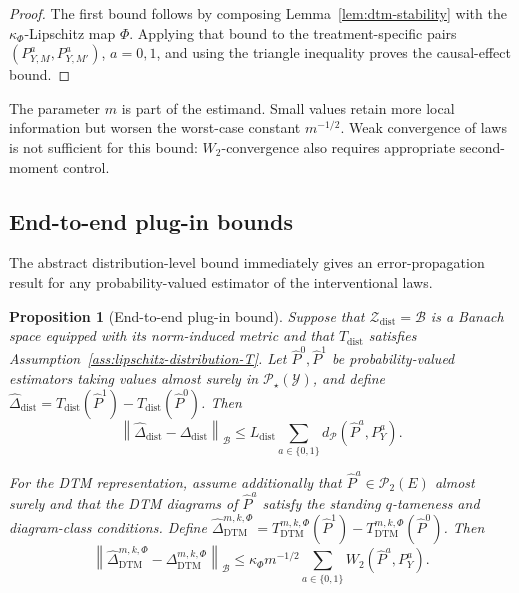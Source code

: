 \documentclass[11pt,a4paper]{article}
\theoremstyle{plain}
\newtheorem{proposition}[theorem]{Proposition}
\theoremstyle{definition}
\theoremstyle{remark}
\newcommand{\1}{\mathbbm{1}}
\begin{document}
\begin{proof}
The first bound follows by composing
Lemma~\ref{lem:dtm-stability} with the
\(\kappa_\Phi\)-Lipschitz map \(\Phi\). Applying that bound to
the treatment-specific pairs
\((P_{Y,M}^a,P_{Y,M'}^a)\), \(a=0,1\), and using the triangle
inequality proves the causal-effect bound.
\end{proof}

The parameter \(m\) is part of the estimand. Small values retain more local information but worsen the worst-case constant \(m^{-1/2}\). Weak convergence of laws is not sufficient for this bound: \(W_2\)-convergence also requires appropriate second-moment control.

\subsection{End-to-end plug-in bounds}
\label{subsec:end-to-end-distribution}

The abstract distribution-level bound immediately gives an
error-propagation result for any probability-valued estimator of the interventional laws.

\begin{proposition}[End-to-end plug-in bound]
\label{prop:end-to-end-distribution}
Suppose that
\(\mathcal Z_{\mathrm{dist}}=\mathcal B\) is a Banach space
equipped with its norm-induced metric and that
\(T_{\mathrm{dist}}\) satisfies
Assumption~\ref{ass:lipschitz-distribution-T}. Let
\(\widehat P^0,\widehat P^1\) be probability-valued estimators
taking values almost surely in
\(\mathcal P_\star(\mathcal Y)\), and define
\(\widehat\Delta_{\mathrm{dist}} = T_{\mathrm{dist}}(\widehat P^1) - T_{\mathrm{dist}}(\widehat P^0)\). Then
\[
\left\|
\widehat\Delta_{\mathrm{dist}}
-
\Delta_{\mathrm{dist}}
\right\|_{\mathcal B}
\leq
L_{\mathrm{dist}}
\sum_{a\in\{0,1\}}
d_{\mathcal P}(\widehat P^a,P_Y^a).
\]

For the DTM representation, assume additionally that
\(\widehat P^a\in\mathcal P_2(E)\) almost surely and that the
DTM diagrams of \(\widehat P^a\) satisfy the standing
\(q\)-tameness and diagram-class conditions. Define
\(\widehat\Delta_{\mathrm{DTM}}^{m,k,\Phi} = T_{\mathrm{DTM}}^{m,k,\Phi}(\widehat P^1) - T_{\mathrm{DTM}}^{m,k,\Phi}(\widehat P^0)\). Then
\[
\left\|
\widehat\Delta_{\mathrm{DTM}}^{m,k,\Phi}
-
\Delta_{\mathrm{DTM}}^{m,k,\Phi}
\right\|_{\mathcal B}
\leq
\kappa_\Phi m^{-1/2}
\sum_{a\in\{0,1\}}
W_2(\widehat P^a,P_Y^a).
\]
\end{proposition}
\end{document}

